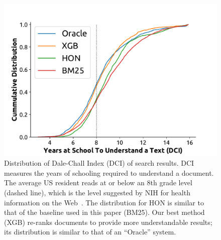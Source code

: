 \begin{figure}[t!]
   \centering
   \includegraphics[width=.41\textwidth]{graphics/cumdist}
    \caption{Distribution of Dale-Chall Index (DCI) of search results. DCI measures the years of schooling required to understand a document. The average US resident reads at or below an 8th grade level (dashed line)\cite{cowan04,wallace04,davis04,stossel12}, which is the level suggested by NIH for health information on the Web~\cite{clear94}. The distribution for HON is similar to that of the baseline used in this paper (BM25). Our best method (XGB) re-ranks documents to provide more understandable results; its distribution is similar to that of an ``Oracle'' system.}
   \label{fig:dist}
\end{figure}


